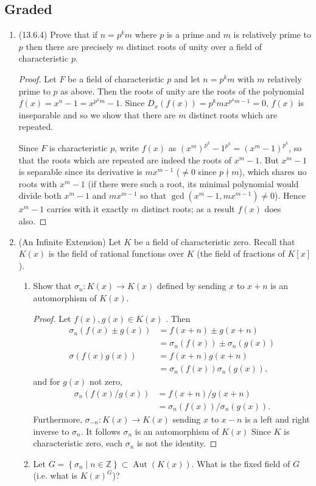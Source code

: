 \documentclass[11pt]{article}
\newcommand{\cbr}[1]{\left\{#1\right\}}
\DeclareMathOperator\Aut{Aut}
\begin{document}
\subsection*{Graded}
\begin{enumerate}
    \item (13.6.4) Prove that if $n = p^km$ where $p$ is a prime and $m$ is relatively prime to $p$ then there are precisely $m$ distinct roots of unity over a field of characteristic $p$. \begin{proof}
        Let $F$ be a field of characteristic $p$ and let $n = p^km$ with $m$ relatively prime to $p$ as above. Then the roots of unity are the roots of the polynomial $f(x) = x^n - 1 = x^{p^km}-1$. Since $D_x(f(x)) = p^kmx^{p^km-1} = 0$, $f(x)$ is inseparable and so we show that there are $m$ distinct roots which are repeated.
        
        Since $F$ is characteristic $p$, write $f(x)$ as $(x^m)^{p^k} - 1^{p^k} = (x^m-1)^{p^k}$, so that the roots which are repeated are indeed the roots of $x^m-1$. But $x^m-1$ is separable since its derivative is $mx^{m-1}$ ($\neq 0$ since $p\nmid m$), which shares no roots with $x^m-1$ (if there were such a root, its minimal polynomial would divide both $x^m-1$ and $mx^{m-1}$ so that $\gcd(x^m-1,mx^{m-1})\neq 0$). Hence $x^m-1$ carries with it exactly $m$ distinct roots; as a result $f(x)$ does also.
    \end{proof}
    \item (An Infinite Extension) Let $K$ be a field of characteristic zero. Recall that $K(x)$ is the field of rational functions over $K$ (the field of fractions of $K[x]$). \begin{enumerate}
        \item Show that $\sigma_n\colon K(x)\to K(x)$ defined by sending $x$ to $x+n$ is an automorphism of $K(x)$. \begin{proof}
            Let $f(x),g(x)\in K(x)$%
            . Then \begin{align*}
                \sigma_n(f(x)\pm g(x)) &= f(x+n) \pm g(x+n)\\
                &= \sigma_n(f(x)) \pm \sigma_n(g(x))\\
                \sigma(f(x)g(x)) &= f(x+n)g(x+n)\\
                &= \sigma_n(f(x))\sigma_n(g(x)),
            \end{align*} and for $g(x)$ not zero, \begin{align*}
                \sigma_n(f(x)/g(x)) &= f(x+n)/g(x+n)\\
                &= \sigma_n(f(x))/\sigma_n(g(x)).
            \end{align*}
            Furthermore, $\sigma_{-n}\colon K(x)\to K(x)$ sending $x$ to $x-n$ is a left and right inverse to $\sigma_n$. It follows $\sigma_n$ is an automorphism of $K(x)$ Since $K$ is characteristic zero, each $\sigma_n$ is not the identity.
        \end{proof}
        \item Let $G = \cbr{\sigma_n\mid n\in \mathbb{Z}}\subset \Aut(K(x))$. What is the fixed field of $G$ (i.e. what is $K(x)^G$)?
        

\end{enumerate}
\end{enumerate}
\end{document}
